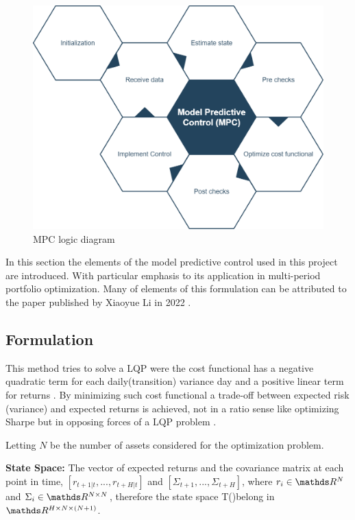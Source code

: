 \begin{figure}[h!]
    \centering
    \includegraphics[width=1\textwidth]{imgs/ch3/MPC drawing.png}
    \caption[\ac{MPC} logic diagram]{\ac{MPC} logic diagram}
    \label{fig::ch3_MPC}
\end{figure}

In this section the elements of the model predictive control used in this project are introduced. With particular emphasis to its application in multi-period portfolio optimization. Many of elements of this formulation can be attributed to the paper published by Xiaoyue Li in 2022 \cite{MultiPeriod_PO_mpc}.

\subsection{Formulation}
This method tries to solve a \ac{LQP}  were the cost functional has a negative quadratic term for each daily(transition) variance day and a positive linear term for returns \cite{MultiPeriod_PO_mpc}. By minimizing such cost functional a trade-off between expected risk (variance) and expected returns is achieved, not in a ratio sense like optimizing Sharpe but in opposing forces of a \ac{LQP}  problem \cite{MultiPeriod_PO_mpc}. 

Letting $N$ be the number of assets considered for the optimization problem.

\textbf{State Space:} The vector of expected returns and the covariance matrix at each point in time, $\left[r_{t+1|t},...,r_{t+H|t}\right]$ and $\left[\Sigma_{t+1},...,\Sigma_{t+H}\right]$, where $r_i \in \R^N$ and $\Sigma_i \in \R^{N\times N}$, therefore the state space {T()}belong in $\R^{H \times N\times(N+1)}$.

